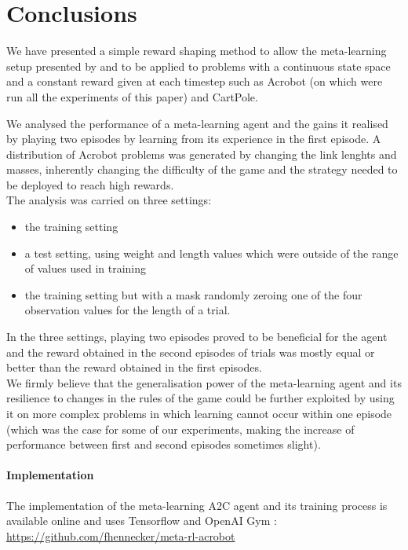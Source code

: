 \documentclass[letterpaper]{article}
\begin{document}
\section{Conclusions}
We have presented a simple reward shaping method to allow the meta-learning
setup presented by \cite{learningtorl} and \cite{fastrlviaslowrl} to be applied
to problems with a continuous state space and a constant reward given at
each timestep such as Acrobot (on which were run all the experiments of this
paper) and CartPole.

We analysed the performance of a meta-learning agent and the gains it realised
by playing two episodes by learning from its experience in the first episode.
A distribution of Acrobot problems was generated by changing the link lenghts
and masses, inherently changing the difficulty of the game and the strategy
needed to be deployed to reach high rewards.\\

The analysis was carried on three settings:
\begin{itemize}
	\item the training setting
	\item a test setting, using weight and length values which were
		outside of the range of values used in training
	\item the training setting but with a mask randomly zeroing one of the
		four observation values for the length of a trial.
\end{itemize}
In the three settings, playing two episodes proved to be beneficial for the 
agent and the reward obtained in the second episodes of trials was mostly
equal or better than the reward obtained in the first episodes.\\

We firmly believe that the generalisation power of the meta-learning agent
and its resilience to changes in the rules of the game could be further
exploited by using it on more complex problems in which learning cannot occur
within one episode (which was the case for some of our experiments, making
the increase of performance between first and second episodes sometimes slight).

\paragraph{Implementation} The implementation of the meta-learning A2C agent
and its training process is available online and uses 
Tensorflow \citep{tensorflow} and OpenAI Gym \citep{gym}:\\
\url{https://github.com/fhennecker/meta-rl-acrobot}
\footnotesize


\end{document}
